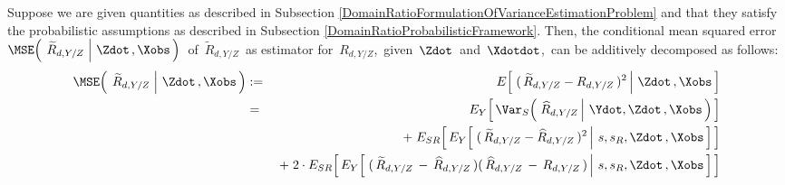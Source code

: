 \vskip 0.1cm
\begin{lemma}
\label{DomainRatioDecompositionMSETtilde}
\mbox{}
\vskip 0.1cm
\noindent
Suppose we are given quantities as described in Subsection
\ref{DomainRatioFormulationOfVarianceEstimationProblem}
and
that they satisfy the probabilistic assumptions as described in Subsection
\ref{DomainRatioProbabilisticFramework}.
Then, the conditional mean squared error
\,$
\MSE\!\left(\;
    \left.
    \widetilde{R}_{d,Y/Z}
    \;\right\vert\,
    \Zdot\,,\Xobs
    \,\right)
$\,
of \,$\widetilde{R}_{d,Y/Z}$\,
as estimator for
\,$R_{d,Y/Z}$,\,
given \,$\Zdot$\, and \,$\Xdotdot$,\,
can be additively decomposed as follows:
\begin{eqnarray*}
\MSE\!\left(\;
    \left.
    \widetilde{R}_{d,Y/Z}
    \;\right\vert\,
    \Zdot\,,\Xobs
    \,\right)
& := &
    E\!\left[\,
        \left.
        (\,\widetilde{R}_{d,Y/Z} - R_{d,Y/Z}\,)^{2}
        \,\right\vert\,
        \Zdot\,,\Xobs
        \,\right]
\\
& = &
    E_{Y}\!\left[\,
    \Var_{S}\!\left(\,
        \left.
        \widehat{R}_{d,Y/Z}
        \,\right\vert\,
        \Ydot,
        \Zdot\,,\Xobs
        \,\right)
        \,\right]
\\
&&
    \;+\;
    E_{SR}\!\left[\,
    E_{Y}\!\left[\,
        \left.
        (\,\widetilde{R}_{d,Y/Z} - \widehat{R}_{d,Y/Z}\,)^{2}
        \,\right\vert\,
        s,s_{R},\Zdot\,,\Xobs
        \,\right]
        \,\right]
\\
&&
    \;+\;
    2\cdot
    E_{SR}\!\left[\,
    E_{Y}\!\left[\,
        \left.
        (\,\widetilde{R}_{d,Y/Z} \,-\, \widehat{R}_{d,Y/Z}\,)(\,\widehat{R}_{d,Y/Z} \,-\, R_{d,Y/Z}\,)
        \,\right\vert\,
        s,s_{R},\Zdot\,,\Xobs
        \,\right]
        \,\right]
\end{eqnarray*}
\end{lemma}
\proof
